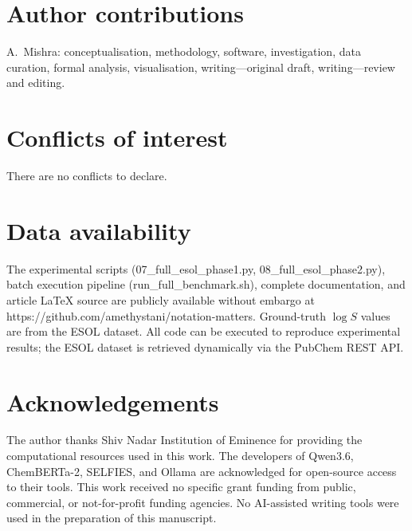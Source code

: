 \documentclass[twoside,twocolumn,9pt]{article}
\newcommand{\logS}{\ensuremath{\log S}}
\begin{document}
\section*{Author contributions}

A.~Mishra: conceptualisation, methodology, software, investigation, data curation, formal analysis, visualisation, writing---original draft, writing---review and editing.

\section*{Conflicts of interest}

There are no conflicts to declare.

\section*{Data availability}

The experimental scripts (07\_full\_esol\_phase1.py, 08\_full\_esol\_phase2.py), batch execution pipeline (run\_full\_benchmark.sh), complete documentation, and article LaTeX source are publicly available without embargo at https://github.com/amethystani/notation-matters. Ground-truth $\logS$ values are from the ESOL dataset.\cite{delaney2004} All code can be executed to reproduce experimental results; the ESOL dataset is retrieved dynamically via the PubChem REST API.

\section*{Acknowledgements}

The author thanks Shiv Nadar Institution of Eminence for providing the computational resources used in this work. The developers of Qwen3.6, ChemBERTa-2, SELFIES, and Ollama are acknowledged for open-source access to their tools. This work received no specific grant funding from public, commercial, or not-for-profit funding agencies. No AI-assisted writing tools were used in the preparation of this manuscript.


\balance



\end{document}
